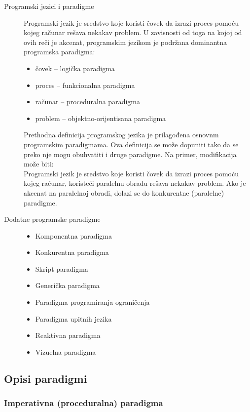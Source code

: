 \documentclass[../main.tex]{subfiles}
\begin{document}
\begin{description}
	\item[Programski jezici i paradigme] \hfill

		Programski jezik je sredstvo koje koristi čovek da izrazi proces pomoću kojeg računar rešava nekakav problem. U zavisnosti od toga na kojoj od ovih reči je akcenat, programskim jezikom je podržana dominantna programska paradigma:
		\begin{itemize}
			\item čovek -- logička paradigma
			\item proces -- funkcionalna paradigma
			\item računar -- proceduralna paradigma
			\item problem -- objektno-orijentisana paradigma
		\end{itemize}
		Prethodna definicija programskog jezika je prilagođena osnovnm programskim paradigmama. Ova definicija se može dopuniti tako da se preko nje mogu obuhvatiti i druge paradigme. Na primer, modifikacija može biti: \\
Programski jezik je sredstvo koje koristi čovek da izrazi proces pomoću kojeg računar, koristeći paralelnu obradu rešava nekakav problem. Ako je akcenat na paralelnoj obradi, dolazi se do konkurentne (paralelne) paradigme.
	\item[Dodatne programske paradigme] \hfill
		\begin{itemize}
			\item Komponentna paradigma
			\item Konkurentna paradigma
			\item Skript paradigma
			\item Generička paradigma
			\item Paradigma programiranja ograničenja
			\item Paradigma upitnih jezika
			\item Reaktivna paradigma
			\item Vizuelna paradigma
		\end{itemize}
\end{description}

\subsection{Opisi paradigmi}											

\subsubsection{Imperativna (proceduralna) paradigma}									
\end{document}
